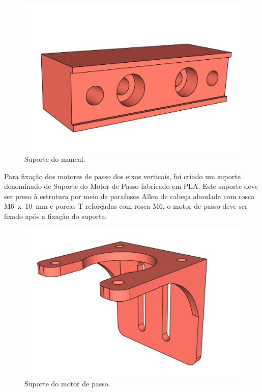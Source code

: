 \begin{figure}[H]
\centering
\caption{Suporte do mancal.}\label{fig:ressuportemancal}
\includegraphics[scale = 0.4]{figuras/ressuportemancal}
\end{figure}
        
\pagebreak

Para fixação dos motores de passo dos eixos verticais, foi criado um suporte denominado 
de Suporte do Motor de Passo fabricado em \ac{PLA}. Este suporte deve ser preso à estrutura 
por meio de parafusos Allen de cabeça abaulada com rosca M6~x~10~mm e porcas T reforçadas com rosca M6, 
o motor de passo deve ser fixado após a fixação do suporte.

\begin{figure}[H]
\centering
\caption{Suporte do motor de passo.}\label{fig:ressuportemotorpasso}
\includegraphics[scale = 0.4]{figuras/ressuportemotorpasso}
\end{figure}

